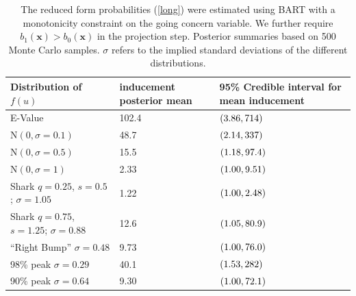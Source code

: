 \documentclass[aoas,preprint, 11pt, dvipsnames, table, x11name]{imsart}
\newcommand{\N}{\mbox{N}}
\renewcommand{\bm}[1]{\mathbf{#1}}
\theoremstyle{remark}
\begin{document}
\begin{table}[!httb]
	\centering

	\begin{tabular}{lP{1.9cm}P{2.9cm}}

		\toprule
		Distribution of $f(u)$   &inducement posterior mean &95\% Credible interval for mean inducement \\ \midrule
		E-Value&102.4&$\qty(3.86, 714)$\\
		
		$\N(0,\sigma=0.1)$ &48.7&$\qty(2.14, 337)$\\ %
		$\N(0,\sigma=0.5)$&15.5 &$\qty(1.18,97.4)$\\%
		$\N(0,\sigma=1)$&2.33&$\qty(1.00, 9.51)$\\
		Shark $q=0.25$, $s=0.5$; $\sigma=1.05$&1.22&$\qty(1.00, 2.48)$\\
		Shark $q=0.75$, $s=1.25$; $\sigma=0.88$&12.6&$\qty(1.05, 80.9)$\\
		
		``Right Bump'' $\sigma=0.48$ &9.73&$\qty(1.00, 76.0)$\\
		98\% peak $\sigma=0.29$&40.1&$\qty(1.53,282)$\\
		90\% peak $\sigma=0.64$&9.30&$\qty(1.00, 72.1)$\\
		
		\bottomrule%
	\end{tabular}
	\caption{The reduced form probabilities (\ref{long}) were estimated using BART with a monotonicity constraint on the going concern variable.  We further require $b_1(\bm{x})>b_0(\bm{x})$ in the projection step. Posterior summaries based on 500 Monte Carlo samples. $\sigma$ refers to the implied standard deviations of the different distributions. }
	\label{resultssummary_rr}
\end{table}
\end{document}
